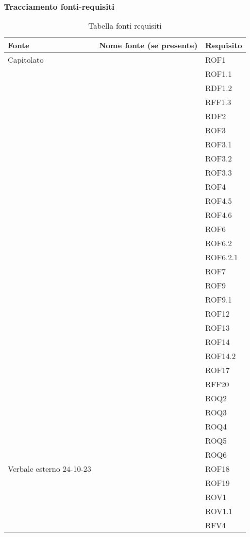 \subsubsection{Tracciamento fonti-requisiti}
\begin{xltabular}{\textwidth}{ p{0.3\textwidth} | X | p{0.2\textwidth} }
    \textbf{\color{white} Fonte} & \textbf{\color{white} Nome fonte (se presente)} & \textbf{\color{white} Requisito} \\ 
    \endhead

    \caption{Tabella fonti-requisiti}
    \endlastfoot


    Capitolato & & ROF1\\
    &&ROF1.1\\ 
    &&RDF1.2\\ 
    &&RFF1.3\\ 
    &&RDF2\\ 
    &&ROF3\\ 
    &&ROF3.1\\ 
    &&ROF3.2\\ 
    &&ROF3.3\\ 
    &&ROF4\\ 
    &&ROF4.5\\ 
    &&ROF4.6\\ 
    &&ROF6\\ 
    &&ROF6.2\\ 
    &&ROF6.2.1\\ 
    &&ROF7\\ 
    &&ROF9\\ 
    &&ROF9.1\\ 
    &&ROF12\\ 
    &&ROF13\\ 
    &&ROF14\\ 
    &&ROF14.2\\ 
    &&ROF17\\ 
    &&RFF20\\ 
    &&ROQ2\\ 
    &&ROQ3\\ 
    &&ROQ4\\ 
    &&ROQ5\\ 
    &&ROQ6\\


     Verbale esterno 24-10-23 & & ROF18\\ 
    &&ROF19\\ 
    &&ROV1\\ 
    &&ROV1.1\\ 
    &&RFV4\\ 



\end{xltabular}
